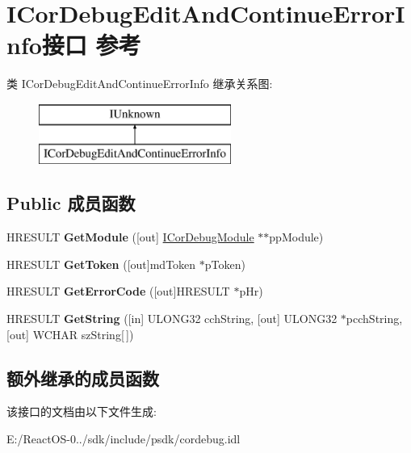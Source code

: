 \hypertarget{interface_i_cor_debug_edit_and_continue_error_info}{}\section{I\+Cor\+Debug\+Edit\+And\+Continue\+Error\+Info接口 参考}
\label{interface_i_cor_debug_edit_and_continue_error_info}
类 I\+Cor\+Debug\+Edit\+And\+Continue\+Error\+Info 继承关系图\+:\begin{figure}[H]
\begin{center}
\leavevmode
\includegraphics[height=2.000000cm]{interface_i_cor_debug_edit_and_continue_error_info}
\end{center}
\end{figure}
\subsection*{Public 成员函数}
\begin{DoxyCompactItemize}
\item 
\mbox{\label{interface_i_cor_debug_edit_and_continue_error_info_aee0cc8ddecc0fc58e37808975c57badc}} 
H\+R\+E\+S\+U\+LT {\bfseries Get\+Module} (\mbox{[}out\mbox{]} \hyperlink{interface_i_cor_debug_module}{I\+Cor\+Debug\+Module} $\ast$$\ast$pp\+Module)
\item 
\mbox{\label{interface_i_cor_debug_edit_and_continue_error_info_a8efb543478f08998d582bdc913e8206b}} 
H\+R\+E\+S\+U\+LT {\bfseries Get\+Token} (\mbox{[}out\mbox{]}md\+Token $\ast$p\+Token)
\item 
\mbox{\label{interface_i_cor_debug_edit_and_continue_error_info_afef13f867e1543675deb621d01b8df2d}} 
H\+R\+E\+S\+U\+LT {\bfseries Get\+Error\+Code} (\mbox{[}out\mbox{]}H\+R\+E\+S\+U\+LT $\ast$p\+Hr)
\item 
\mbox{\label{interface_i_cor_debug_edit_and_continue_error_info_a544dd082381e7b1ec45588eff8eba7b9}} 
H\+R\+E\+S\+U\+LT {\bfseries Get\+String} (\mbox{[}in\mbox{]} U\+L\+O\+N\+G32 cch\+String, \mbox{[}out\mbox{]} U\+L\+O\+N\+G32 $\ast$pcch\+String, \mbox{[}out\mbox{]} W\+C\+H\+AR sz\+String\mbox{[}$\,$\mbox{]})
\end{DoxyCompactItemize}
\subsection*{额外继承的成员函数}


该接口的文档由以下文件生成\+:\begin{DoxyCompactItemize}
\item 
E\+:/\+React\+O\+S-\/0../sdk/include/psdk/cordebug.\+idl\end{DoxyCompactItemize}

